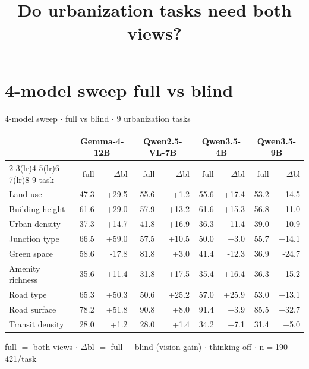 \documentclass[aspectratio=169]{beamer}
\title{Do urbanization tasks need both views?}
\date{}\author{}
\begin{document}
\maketitle
\section{4-model sweep \textemdash{} full vs blind}
\begin{frame}{4-model sweep \textbf{$\cdot$} full vs blind \textbf{$\cdot$} 9 urbanization tasks}
\centering\scriptsize
\begin{tabular}{lrrrrrrrr}
\toprule
 & \multicolumn{2}{c}{Gemma-4-12B} & \multicolumn{2}{c}{Qwen2.5-VL-7B} & \multicolumn{2}{c}{Qwen3.5-4B} & \multicolumn{2}{c}{Qwen3.5-9B} \\
\cmidrule(lr){2-3}\cmidrule(lr){4-5}\cmidrule(lr){6-7}\cmidrule(lr){8-9}
task & full & $\Delta$bl & full & $\Delta$bl & full & $\Delta$bl & full & $\Delta$bl \\
\midrule
Land use & 47.3 & \textcolor{good}{+29.5} & 55.6 & +1.2 & 55.6 & \textcolor{good}{+17.4} & 53.2 & \textcolor{good}{+14.5} \\
Building height & 61.6 & \textcolor{good}{+29.0} & 57.9 & \textcolor{good}{+13.2} & 61.6 & \textcolor{good}{+15.3} & 56.8 & \textcolor{good}{+11.0} \\
Urban density & 37.3 & \textcolor{good}{+14.7} & 41.8 & \textcolor{good}{+16.9} & 36.3 & \textcolor{bad}{-11.4} & 39.0 & \textcolor{bad}{-10.9} \\
Junction type & 66.5 & \textcolor{good}{+59.0} & 57.5 & \textcolor{good}{+10.5} & 50.0 & +3.0 & 55.7 & \textcolor{good}{+14.1} \\
Green space & 58.6 & \textcolor{bad}{-17.8} & 81.8 & +3.0 & 41.4 & \textcolor{bad}{-12.3} & 36.9 & \textcolor{bad}{-24.7} \\
Amenity richness & 35.6 & \textcolor{good}{+11.4} & 31.8 & \textcolor{good}{+17.5} & 35.4 & \textcolor{good}{+16.4} & 36.3 & \textcolor{good}{+15.2} \\
Road type & 65.3 & \textcolor{good}{+50.3} & 50.6 & \textcolor{good}{+25.2} & 57.0 & \textcolor{good}{+25.9} & 53.0 & \textcolor{good}{+13.1} \\
Road surface & 78.2 & \textcolor{good}{+51.8} & 90.8 & \textcolor{good}{+8.0} & 91.4 & +3.9 & 85.5 & \textcolor{good}{+32.7} \\
Transit density & 28.0 & +1.2 & 28.0 & +1.4 & 34.2 & \textcolor{good}{+7.1} & 31.4 & \textcolor{good}{+5.0} \\
\bottomrule
\end{tabular}
\vspace{2pt}\par\tiny full $=$ both views \textbf{$\cdot$} $\Delta$bl $=$ full $-$ blind (vision gain) \textbf{$\cdot$} thinking off \textbf{$\cdot$} n$=$190--421/task
\end{frame}
\end{document}
